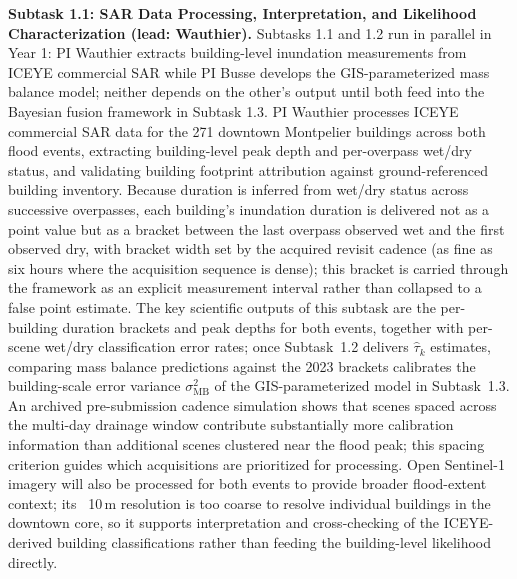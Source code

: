 \documentclass[11pt]{article}
\begin{document}
\textbf{Subtask 1.1: SAR Data Processing, Interpretation, and Likelihood Characterization
(lead: Wauthier).}
Subtasks 1.1 and 1.2 run in parallel in Year 1: PI Wauthier extracts building-level inundation measurements from ICEYE commercial SAR while PI Busse develops the GIS-parameterized mass balance model; neither depends on the other's output until both feed into the Bayesian fusion framework in Subtask 1.3.
PI Wauthier processes ICEYE commercial SAR data for the 271 downtown Montpelier buildings across both flood events, extracting building-level peak depth and per-overpass wet/dry status, and validating building footprint attribution against ground-referenced building inventory.
Because duration is inferred from wet/dry status across successive overpasses, each building's inundation duration is delivered not as a point value but as a bracket between the last overpass observed wet and the first observed dry, with bracket width set by the acquired revisit cadence (as fine as six hours where the acquisition sequence is dense); this bracket is carried through the framework as an explicit measurement interval rather than collapsed to a false point estimate.
The key scientific outputs of this subtask are the per-building duration brackets and peak depths for both events, together with per-scene wet/dry classification error rates; once Subtask~1.2 delivers $\hat{\tau}_k$ estimates, comparing mass balance predictions against the 2023 brackets calibrates the building-scale error variance $\sigma_{\mathrm{MB}}^2$ of the GIS-parameterized model in Subtask~1.3.
An archived pre-submission cadence simulation shows that scenes spaced across the multi-day drainage window contribute substantially more calibration information than additional scenes clustered near the flood peak; this spacing criterion guides which acquisitions are prioritized for processing.
Open Sentinel-1 imagery will also be processed for both events to provide broader flood-extent context; its ~10\,m resolution is too coarse to resolve individual buildings in the downtown core, so it supports interpretation and cross-checking of the ICEYE-derived building classifications rather than feeding the building-level likelihood directly.
\end{document}

